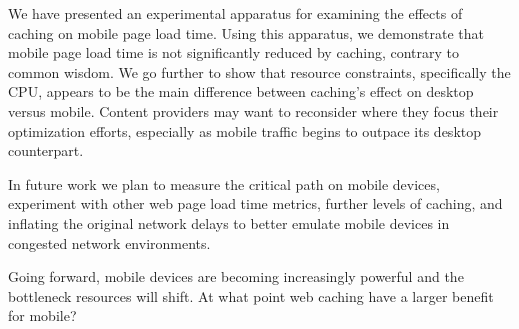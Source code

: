 We have presented an experimental apparatus for examining the effects of caching on mobile page load time.
Using this apparatus, we demonstrate that mobile page load time is not significantly reduced by caching, contrary to common wisdom.
We go further to show that resource constraints, specifically the CPU, appears to be the main difference between caching's effect on desktop versus mobile.
Content providers may want to reconsider where they focus their optimization efforts, especially as mobile traffic begins to outpace its desktop counterpart.

In future work we plan to measure the critical path on mobile devices, experiment with other web page load time metrics, further levels of caching, and inflating the original network delays to better emulate mobile devices in congested network environments. 

Going forward, mobile devices are becoming increasingly powerful and the bottleneck resources will shift. At what point web caching have a larger benefit for mobile?  



